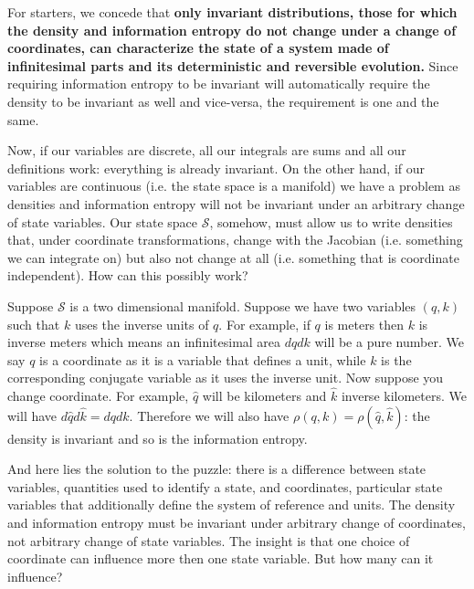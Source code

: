 \documentclass[11pt]{elsarticle}
\begin{document}
For starters, we concede that \textbf{only invariant distributions, those for which the density and information entropy do not change under a change of coordinates, can characterize the state of a system made of infinitesimal parts and its deterministic and reversible evolution.} Since requiring information entropy to be invariant will automatically require the density to be invariant as well and vice-versa, the requirement is one and the same.

Now, if our variables are discrete, all our integrals are sums and all our definitions work: everything is already invariant. On the other hand, if our variables are continuous (i.e. the state space is a manifold) we have a problem as densities and information entropy will not be invariant under an arbitrary change of state variables. Our state space $\mathcal{S}$, somehow, must allow us to write densities that, under coordinate transformations, change with the Jacobian (i.e. something we can integrate on) but also not change at all (i.e. something that is coordinate independent). How can this possibly work?

Suppose $\mathcal{S}$ is a two dimensional manifold. Suppose we have two variables $(q,k)$ such that $k$ uses the inverse units of $q$. For example, if $q$ is meters then $k$ is inverse meters which means an infinitesimal area $dq dk$ will be a pure number. We say $q$ is a coordinate as it is a variable that defines a unit, while $k$ is the corresponding conjugate variable as it uses the inverse unit. Now suppose you change coordinate. For example, $\hat{q}$ will be kilometers and $\hat{k}$ inverse kilometers. We will have $d\hat{q} d\hat{k} = dq dk$. Therefore we will also have $\rho(q,k) = \rho(\hat{q}, \hat{k})$: the density is invariant and so is the information entropy.

And here lies the solution to the puzzle: there is a difference between state variables, quantities used to identify a state, and coordinates, particular state variables that additionally define the system of reference and units. The density and information entropy must be invariant under arbitrary change of coordinates, not arbitrary change of state variables. The insight is that one choice of coordinate can influence more then one state variable. But how many can it influence?
\end{document}
